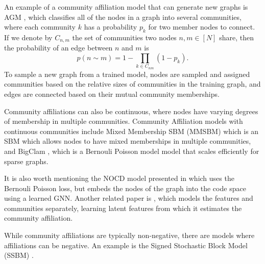 \documentclass[letterpaper]{article} %
\newtheorem{definition}[theorem]{Definition}
\begin{document}
An example of a community affiliation model that can generate new graphs is AGM \cite{Overlapping2012}, which classifies all of the nodes in a graph into several communities, where each community $k$ has a probability $p_k$ for two member nodes to connect. If we denote by $C_{n,m}$ the set of communities two nodes $n,m \in [N]$  share, then the probability of an edge between $n$ and $m$ is
\[
p(n\sim m) = 1 - \prod_{k \in C_{nm}} (1 - p_k).
\]
To sample a new graph from a trained model, nodes are sampled and assigned communities based on the relative sizes of communities in the training graph, and edges are connected based on their mutual community memberships.  
 
Community affiliations can also be continuous, where nodes have varying degrees of membership in multiple communities.
Community Affiliation models with continuous communities include Mixed Membership SBM (MMSBM)  \cite{airoldi2008mixed} which is an SBM which allows nodes to have mixed memberships in multiple communities, and BigClam \cite{yang2013BigClam}, which is a Bernouli Poisson model model that scales efficiently for sparse graphs. 


It is also worth mentioning the NOCD model presented in \cite{shchur2019overlapping} which uses the Bernouli Poisson loss, but embeds the nodes of the graph into the code space using a learned GNN. Another related paper is \cite{sun2019vgraph}, which models the features and communities separately, learning latent features from which it estimates the community affiliation. 

While community affiliations are typically non-negative, there are models where affiliations can be negative. An example is the Signed Stochastic Block Model (SSBM) \cite{jiang2015stochastic}.



\end{document}
